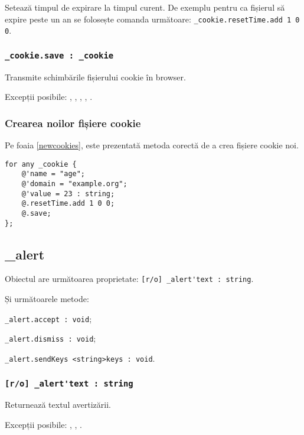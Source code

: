 Setează timpul de expirare la timpul curent. De exemplu pentru ca fișierul să expire peste un an se folosește comanda următoare: \lstinline|_cookie.resetTime.add 1 0 0|.

\subsubsection{\lstinline|_cookie.save : _cookie|}

Transmite schimbările fișierului cookie în browser.

Excepții posibile: , , , , .

\subsubsection{Crearea noilor fișiere cookie}

Pe foaia \ref{newcookies}, este prezentată metoda corectă de a crea fișiere cookie noi.

\begin{lstlisting}[caption=Crearea noilor fișiere cookie, label=newcookies]
for any _cookie {
	@'name = "age";
	@'domain = "example.org";
	@'value = 23 : string;
	@.resetTime.add 1 0 0;
	@.save;
};
\end{lstlisting}


\subsection{{\color{orange} \_alert}}

Obiectul \alert{} are următoarea proprietate: \lstinline|[r/o] _alert'text : string|.

Și următoarele metode:
\begin{icItems}
	\item \lstinline|_alert.accept : void|;
	\item \lstinline|_alert.dismiss : void|;
	\item \lstinline|_alert.sendKeys <string>keys : void|.
\end{icItems}

\subsubsection{\lstinline|[r/o] _alert'text : string|}

Returnează textul avertizării.

Excepții posibile: , , .

